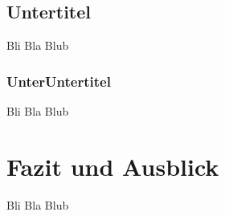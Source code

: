 \documentclass[
	ngerman, 
	fontsize=9pt,
	accentcolor=1b,%
	type=intern,
	marginpar=false,
	]{tudapub}
\begin{document}
\subsection{Untertitel}
\begin{changemargin}{0.5cm}{0.5cm}

Bli Bla Blub \citep{jorkeGrosseDemokratieUber2019}

\end{changemargin}

\subsubsection{UnterUntertitel}
\begin{changemargin}{0.5cm}{0.5cm}

Bli Bla Blub

\end{changemargin}


\section{Fazit und Ausblick}
\begin{changemargin}{0.5cm}{0.5cm}

Bli Bla Blub

\end{changemargin}


\end{document}

